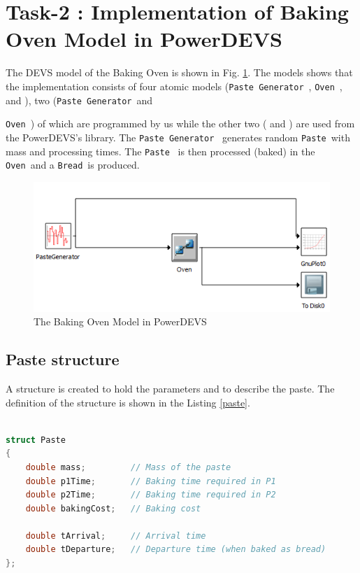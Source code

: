 \documentclass[titlepage]{article}%
\newcommand{\oven}{\texttt{Oven}~}
\newcommand{\pgen}{\texttt{Paste Generator}~}
\newcommand{\paste}{\texttt{Paste}~}
\newcommand{\bread}{\texttt{Bread}~}
\begin{document}
\section{Task-2 : Implementation of Baking Oven Model in PowerDEVS}

The DEVS model of the Baking Oven is shown in Fig. \ref{fig:model}. The models shows that the 
implementation consists of four atomic models (\pgen, \oven, 
{} and {}), two (\pgen and 
{\oven) of which are programmed by us while the other two ({} and 
{}) are used from the PowerDEVS's library. The \pgen 
generates random \paste with mass and processing times. The \paste 
is then processed (baked) in the \oven and a \bread is produced. 

\begin{figure}[htbp]
	\centering
		\includegraphics[scale=0.8]{model.PNG}
	\caption{The Baking Oven Model in PowerDEVS}
	\label{fig:model}
\end{figure}

\subsection{Paste structure}

A structure is created to hold the parameters and to describe the paste. The definition of the structure is shown in the Listing \ref{paste}.

\begin{lstlisting}[caption={Paste structure}, language=c++, label={paste}]

struct Paste
{
    double mass;         // Mass of the paste
    double p1Time;       // Baking time required in P1
    double p2Time;       // Baking time required in P2
    double bakingCost;   // Baking cost
	
    double tArrival;     // Arrival time
    double tDeparture;   // Departure time (when baked as bread)
};


\end{lstlisting}}
\end{document}
